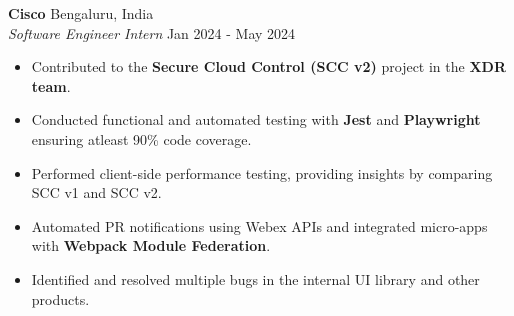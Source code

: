 \documentclass[a4paper]{article}
\newcommand{\bulletSep} { \vspace{2.5mm} }
\newcommand{\sectionSep} { \vspace{3mm} }
\newcommand{\experienceItem}[5]{
    \textbf{#1} \hfill #2 \\
    \textit{#3} \hfill #4 \\
    #5
}
\begin{document}
\experienceItem{Cisco}{Bengaluru, India}{Software Engineer Intern}{Jan 2024 - May 2024}{
    \begin{itemize}
        \item Contributed to the \textbf{Secure Cloud Control (SCC v2)} project in the \textbf{XDR team}.
        \item Conducted functional and automated testing with \textbf{Jest} and \textbf{Playwright} ensuring atleast 90\% code coverage.
        \item Performed client-side performance testing, providing insights by comparing SCC v1 and SCC v2.
        \item Automated PR notifications using Webex APIs and integrated micro-apps with \textbf{Webpack Module Federation}.
        \item Identified and resolved multiple bugs in the internal UI library and other products.
    \end{itemize}
}




\sectionSep

\end{document}
